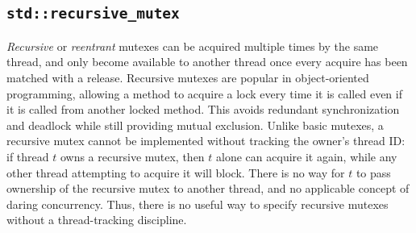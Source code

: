\subsection{\texorpdfstring{\lstinline{std::recursive_mutex}}{std::recursive\_mutex}}
\emph{Recursive} or \emph{reentrant} mutexes can be acquired multiple times by the same thread, and only become available to another thread once every acquire has been matched with a release. Recursive mutexes are popular in object-oriented programming, allowing a method to acquire a lock every time it is called even if it is called from another locked method. %
This avoids redundant synchronization and deadlock while still providing mutual exclusion.
Unlike basic mutexes, a recursive mutex cannot be implemented without tracking the owner's thread ID: if thread $t$ owns a recursive mutex, then $t$ alone can acquire it again, while any other thread attempting to acquire it will block. There is no way for $t$ to pass ownership of the recursive mutex to another thread, and no applicable concept of daring concurrency. Thus, there is no useful way to specify recursive mutexes without a thread-tracking discipline. %


